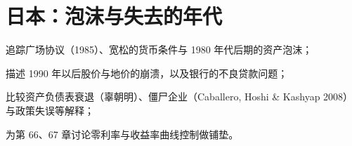 \chapter{日本：泡沫与失去的年代}\label{ch:japanbubble}

\begin{chapterguide}
\begin{guidegoals}
\item 追踪广场协议（1985）、宽松的货币条件与 1980 年代后期的资产泡沫；
\item 描述 1990 年以后股价与地价的崩溃，以及银行的不良贷款问题；
\item 比较资产负债表衰退（辜朝明）、僵尸企业（Caballero, Hoshi \& Kashyap 2008）与政策失误等解释；
\item 为第 66、67 章讨论零利率与收益率曲线控制做铺垫。
\end{guidegoals}
\end{chapterguide}

\chapterstub
